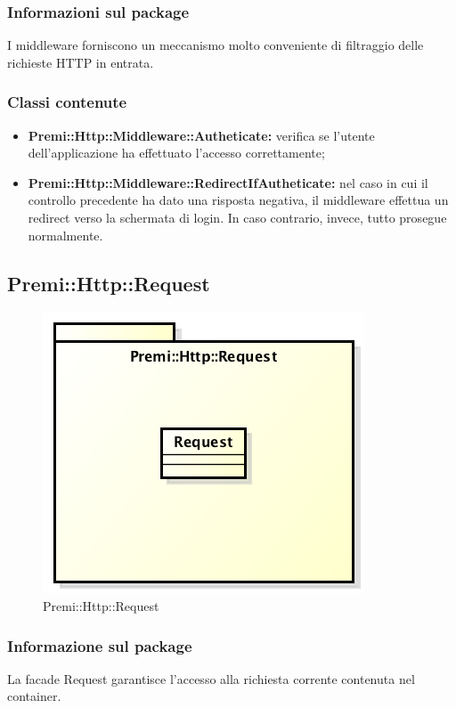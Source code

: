 	\subsubsection*{Informazioni sul package}
	I middleware forniscono un meccanismo molto conveniente di filtraggio delle richieste HTTP in entrata.
	\subsubsection*{Classi contenute}
		\begin{itemize}
			\item \textbf{Premi::Http::Middleware::Autheticate:} verifica se l'utente dell'applicazione ha effettuato l'accesso correttamente;
			\item \textbf{Premi::Http::Middleware::RedirectIfAutheticate:} nel caso in cui il controllo precedente ha dato una risposta negativa, il middleware effettua un redirect verso la schermata di login. In caso contrario, invece, tutto prosegue normalmente.
		\end{itemize}
		
\newpage
\subsection{Premi::Http::Request}
\begin{figure}[h]
\centering
\includegraphics[width=0.7\linewidth]{img/premi_http_request}
\caption[Premi::Http::Request]{Premi::Http::Request}
\label{fig:premi_http_request}
\end{figure}
	\subsubsection*{Informazione sul package}
	La facade Request garantisce l'accesso alla richiesta corrente contenuta nel container.

